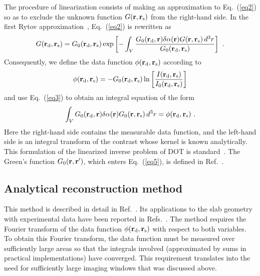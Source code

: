 The procedure of linearization consists of making an approximation to Eq.~(\ref{eq2}) so as to exclude the unknown function $G({\bf r}, {\bf  r}_{\rm s})$ from the right-hand side. In the first Rytov approximation~\cite{schotland_97_1}, Eq.~(\ref{eq2}) is rewritten as
%
\begin{equation}
G({\bf r}_{\rm d}, {\bf r}_{\rm s}) = G_0({\bf r}_{\rm d}, {\bf r}_{\rm s})
\exp\left[ -\int_V \frac{G_0({\bf r}_{\rm d}, {\bf r}) \delta\alpha({\bf r})
G({\bf r}, {\bf r}_{\rm s}) \,d^3r}{G_0({\bf r}_{\rm d}, {\bf r}_{\rm s})}
\right] \ .
\label{eq3}
\end{equation}
%
\noindent
Consequently, we define the data function $\phi({\bf r}_{\rm d}, {\bf
  r}_{\rm s})$ according to
%
\begin{equation}
\phi({\bf r}_{\rm d},{\bf r}_{\rm s})=
-G_0({\bf r}_{\rm d},{\bf r}_{\rm s})
\ln\left[\frac{I({\bf r}_{\rm d},{\bf r}_{\rm s})}
{I_0({\bf r}_{\rm d},{\bf r}_{\rm s})}\right]
\label{eq4}
\end{equation}
%
\noindent
and use Eq.~(\ref{eq3}) to obtain an integral equation of the form
%
\begin{equation}
\int_VG_0({\bf r}_{\rm d}, {\bf r})\delta\alpha({\bf r}) G_0({\bf r},
{\bf r}_{\rm s})\,d^3r = \phi({\bf r}_{\rm d}, {\bf r}_{\rm s}) \ .
\label{eq5}
\end{equation}
%
\noindent
Here the right-hand side contains the measurable data function, and the left-hand side is an integral transform of the contrast whose kernel
is known analytically. This formulation of the linearized inverse problem of DOT is standard~\cite{schotland_97_1}. The Green's function $G_0({\bf r},{\bf r}^{\prime})$, which enters Eq.~(\ref{eq5}), is defined in Ref.~\cite{markel_04_4}.

\subsection{Analytical reconstruction method}
\label{subsec:fourier_rec}

This method is described in detail in Ref.~\cite{markel_04_4}.  Its applications to the slab geometry with experimental data have been reported in Refs.~\cite{wang_05_1,konecky_08_1}. The method requires the Fourier transform of the data function $\phi({\bf r}_{\rm d}, {\bf  r}_{\rm s})$ with respect to both variables. To obtain this Fourier transform, the data function must be measured over sufficiently large areas so that the integrals involved (approximated by sums in practical implementations) have converged. This requirement translates into the need for sufficiently large imaging windows that was discussed above. 

